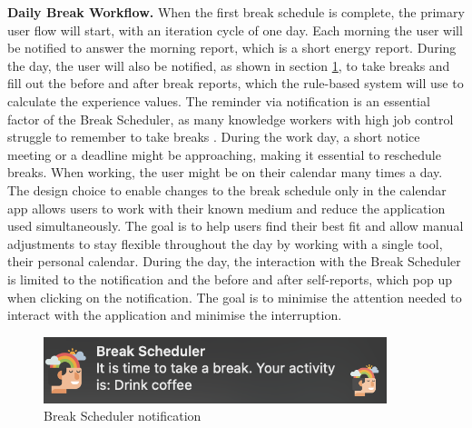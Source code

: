 \documentclass{hasel_thesis}
\begin{document}
\textbf{Daily Break Workflow.} When the first break schedule is complete, the primary user flow will start, with an iteration cycle of one day. Each morning the user will be notified to answer the morning report, which is a short energy report. During the day, the user will also be notified, as shown in section \ref{fig:notification}, to take breaks and fill out the before and after break reports, which the rule-based system will use to calculate the experience values. The reminder via notification is an essential factor of the Break Scheduler, as many knowledge workers with high job control struggle to remember to take breaks \cite{McLean.2001}. During the work day, a short notice meeting or a deadline might be approaching, making it essential to reschedule breaks. When working, the user might be on their calendar many times a day. The design choice to enable changes to the break schedule only in the calendar app allows users to work with their known medium and reduce the application used simultaneously. The goal is to help users find their best fit and allow manual adjustments to stay flexible throughout the day by working with a single tool, their personal calendar. During the day, the interaction with the Break Scheduler is limited to the notification and the before and after self-reports, which pop up when clicking on the notification. The goal is to minimise the attention needed to interact with the application and minimise the interruption. 

\begin{figure}[htp]
    \centering
    \includegraphics[width=10cm]{hasel_thesis/images/notification.png}
    \caption{Break Scheduler notification}
    \label{fig:notification}
\end{figure}
\end{document}
